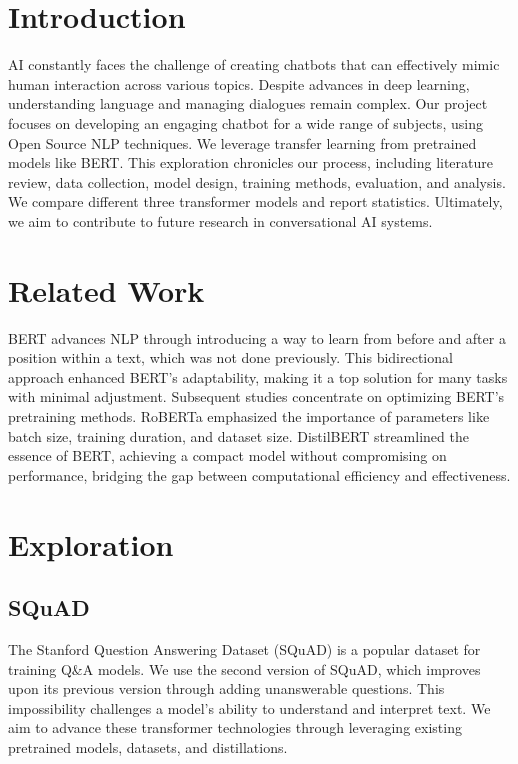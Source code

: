 \documentclass[12pt]{extarticle}
\begin{document}
\section{Introduction}

AI constantly faces the challenge of creating chatbots that can effectively mimic human interaction across various topics. Despite advances in deep learning, understanding language and managing dialogues remain complex. Our project focuses on developing an engaging chatbot for a wide range of subjects, using Open Source NLP techniques. We leverage transfer learning from pretrained models like BERT. This exploration chronicles our process, including literature review, data collection, model design, training methods, evaluation, and analysis. We compare different three transformer models and report statistics. Ultimately, we aim to contribute to future research in conversational AI systems.

\section{Related Work}

BERT \textcite{devlin2018bert} advances NLP through introducing a way to learn from before and after a position within a text, which was not done previously. This bidirectional approach enhanced BERT's adaptability, making it a top solution for many tasks with minimal adjustment. Subsequent studies concentrate on optimizing BERT's pretraining methods. RoBERTa emphasized the importance of parameters like batch size, training duration, and dataset size. DistilBERT streamlined the essence of BERT, achieving a compact model without compromising on performance, bridging the gap between computational efficiency and effectiveness.

\section{Exploration}

\subsection{SQuAD}

The Stanford Question Answering Dataset (SQuAD) is a popular dataset for training Q\&A models. We use the second version of SQuAD, which improves upon its previous version through adding unanswerable questions. This impossibility challenges a model's ability to understand and interpret text.  We aim to advance these transformer technologies through leveraging existing pretrained models, datasets, and distillations.
\end{document}
